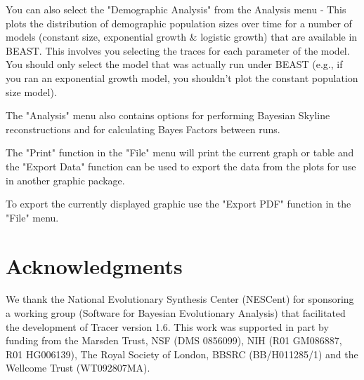 \documentclass{bioinfo}
\begin{document}
You can also select the "Demographic Analysis" from the Analysis menu - This plots the distribution of demographic population sizes over time for a number of models (constant size, exponential growth \& logistic growth) that are available in BEAST. This involves you selecting the traces for each parameter of the model. You should only select the model that was actually run under BEAST (e.g., if you ran an exponential growth model, you shouldn't plot the constant population size model).

The "Analysis" menu also contains options for performing Bayesian Skyline reconstructions and for calculating Bayes Factors between runs.

The "Print" function in the "File" menu will print the current graph or table and the "Export Data" function can be used to export the data from the plots for use in another graphic package.

To export the currently displayed graphic use the "Export PDF" function in the "File" menu.



\section*{Acknowledgments}

We thank the National Evolutionary Synthesis Center (NESCent) for sponsoring a working group (Software for Bayesian Evolutionary Analysis) that facilitated the development of Tracer version 1.6. 
This work was supported in part by funding from the Marsden Trust, NSF (DMS 0856099), NIH (R01 GM086887, R01 HG006139), The Royal Society of London, BBSRC (BB/H011285/1) and the Wellcome Trust (WT092807MA).



\end{document}

